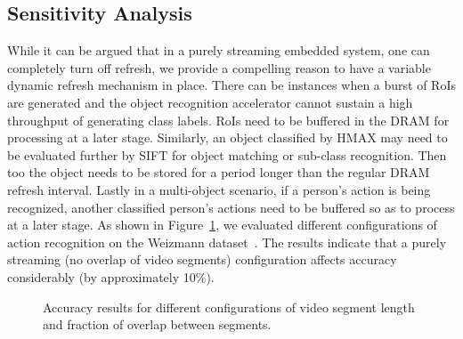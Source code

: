 \subsection{Sensitivity Analysis}
While it can be argued that in a purely streaming embedded system, one can completely turn off refresh, we provide a compelling reason to have a variable dynamic refresh mechanism in place. There can be instances when a burst of RoIs are generated and the object recognition accelerator cannot sustain a high throughput of generating class labels. RoIs need to be buffered in the DRAM for processing at a later stage. Similarly, an object classified by HMAX may need to be evaluated further by SIFT for object matching or sub-class recognition. Then too the object needs to be stored for a period longer than the regular DRAM refresh interval. Lastly in a multi-object scenario, if a person's action is being recognized, another classified person's actions need to be buffered so as to process at a later stage. As shown in Figure~\ref{fig:ActionRecognition}, we evaluated different configurations of action recognition on the Weizmann dataset~\cite{Weizmann}. The results indicate that a purely streaming (no overlap of video segments) configuration affects accuracy considerably (by approximately 10\%).  

\begin{figure}[ht!]
\centering
{}
\caption{\label{fig:ActionRecognition} Accuracy results for different configurations of video segment length and fraction of overlap between segments.}
\vspace{-0.2in}
\end{figure}


